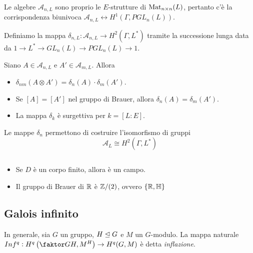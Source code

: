 \begin{oss}
    Le algebre $\mathcal A_{n,L}$ sono proprio le $E$-strutture di $\operatorname{Mat}_{n\times n}(L)$, pertanto c'è la corrispondenza biunivoca $\mathcal A_{n,L}\leftrightarrow H^1(\Gamma, PGL_n(L))$.
\end{oss}

\begin{definition}
    Definiamo la mappa $\delta_{n,L}:\mathcal A_{n,L}\to H^2(\Gamma,L^\ast)$ tramite la successione lunga data da $1\to L^\ast\to GL_n(L)\to PGL_n(L)\to1$.
\end{definition}

\begin{lemma}
    Siano $A\in\mathcal A_{n,L}$ e $A'\in\mathcal A_{m,L}$. Allora
    \begin{itemize}
        \item $\delta_{nm}(A\otimes A')=\delta_n(A)\cdot \delta_m(A')$.
        \item Se $[A]=[A']$ nel gruppo di Brauer, allora $\delta_n(A)=\delta_m(A')$.
        \item La mappa $\delta_k$ è surgettiva per $k=[L:E]$.
    \end{itemize}
\end{lemma}

\begin{theorem}
    Le mappe $\delta_n$ permettono di costruire l'isomorfismo di gruppi $$\mathcal A_L \cong H^2(\Gamma,L^\ast)$$
\end{theorem}


\begin{corollary}$ $
    \begin{itemize}
        \item Se $D$ è un corpo finito, allora è un campo.
        \item Il gruppo di Brauer di $\mathbb{R}$ è $\mathbb{Z}/(2)$, ovvero $\{ \mathbb{R},\mathbb{H} \}$
    \end{itemize}
\end{corollary}


\subsection{Galois infinito}

\begin{definition}
    In generale, sia $G$ un gruppo,  $H\mathrel{\unlhd} G$ e $M$ un $G$-modulo. La mappa naturale $Inf^q:H^q\left(\faktor G H, M^H\right)\rightarrow H^q(G,M)$ è detta \emph{inflazione}.
\end{definition}

